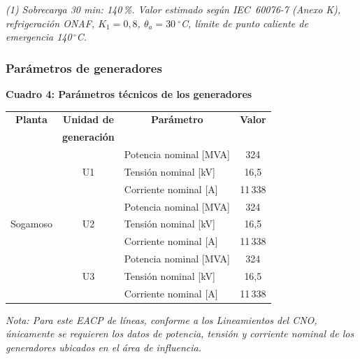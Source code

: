 \begin{minipage}{0.90\textwidth}
\footnotesize
\textit{(1) Sobrecarga 30 min: 140\,\%. Valor estimado según IEC~60076-7 (Anexo K), refrigeración ONAF, $K_1 = 0{,}8$, $\theta_a = 30\ ^\circ$C, límite de punto caliente de emergencia 140\,$^\circ$C.
}
\end{minipage}


\subsubsection{Parámetros de generadores}

\begin{center}

\textbf{Cuadro 4: Parámetros técnicos de los generadores}

\vspace{2mm}

\scriptsize
\renewcommand{\arraystretch}{1.1}

\begin{tabular}{|c|c|p{6.0cm}|c|}
\hline

\textbf{Planta} &
\textbf{Unidad de} &
\multicolumn{1}{c|}{\textbf{Parámetro}} &
\textbf{Valor} \\

&
\textbf{generación} &
&
\\
\hline

\multirow{9}{*}{\centering Sogamoso}
&
\multirow{3}{*}{\centering U1}
& Potencia nominal [MVA] & 324 \\ \cline{3-4}
& & Tensión nominal [kV] & 16,5 \\ \cline{3-4}
& & Corriente nominal [A] & 11\,338 \\ \cline{2-4}

&
\multirow{3}{*}{\centering U2}
& Potencia nominal [MVA] & 324 \\ \cline{3-4}
& & Tensión nominal [kV] & 16,5 \\ \cline{3-4}
& & Corriente nominal [A] & 11\,338 \\ \cline{2-4}

&
\multirow{3}{*}{\centering U3}
& Potencia nominal [MVA] & 324 \\ \cline{3-4}
& & Tensión nominal [kV] & 16,5 \\ \cline{3-4}
& & Corriente nominal [A] & 11\,338 \\ \hline

\end{tabular}

\vspace{3mm}

\begin{minipage}{0.90\textwidth}
\footnotesize
\textit{Nota: Para este EACP de líneas, conforme a los Lineamientos del CNO, únicamente se requieren los datos de potencia, tensión y corriente nominal de los generadores ubicados en el área de influencia.}
\end{minipage}

\end{center}
